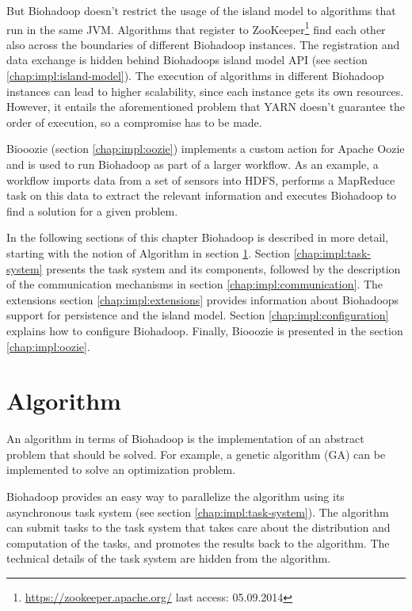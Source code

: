 But Biohadoop doesn't restrict the usage of the island model to algorithms that run in the same JVM. Algorithms that register to ZooKeeper\footnote{\url{https://zookeeper.apache.org/} last access: 05.09.2014} find each other also across the boundaries of different Biohadoop instances. The registration and data exchange is hidden behind Biohadoops island model API (see section \ref{chap:impl:island-model}). The execution of algorithms in different Biohadoop instances can lead to higher scalability, since each instance gets its own resources. However, it entails the aforementioned problem that YARN doesn't guarantee the order of execution, so a compromise has to be made.

Biooozie (section \ref{chap:impl:oozie}) implements a custom action for Apache Oozie and is used to run Biohadoop as part of a larger workflow. As an example, a workflow imports data from a set of sensors into HDFS, performs a MapReduce task on this data to extract the relevant information and executes Biohadoop to find a solution for a given problem.

In the following sections of this chapter Biohadoop is described in more detail, starting with the notion of Algorithm in section \ref{chap:impl:algorithm}. Section \ref{chap:impl:task-system} presents the task system and its components, followed by the description of the communication mechanisms in section \ref{chap:impl:communication}. The extensions section \ref{chap:impl:extensions} provides information about Biohadoops support for persistence and the island model. Section \ref{chap:impl:configuration} explains how to configure Biohadoop. Finally, Biooozie is presented in the section \ref{chap:impl:oozie}.

\section{Algorithm}
\label{chap:impl:algorithm}
An algorithm in terms of Biohadoop is the implementation of an abstract problem that should be solved. For example, a genetic algorithm (GA) can be implemented to solve an optimization problem.

Biohadoop provides an easy way to parallelize the algorithm using its asynchronous task system (see section \ref{chap:impl:task-system}). The algorithm can submit tasks to the task system that takes care about the distribution and computation of the tasks, and promotes the results back to the algorithm. The technical details of the task system are hidden from the algorithm.

